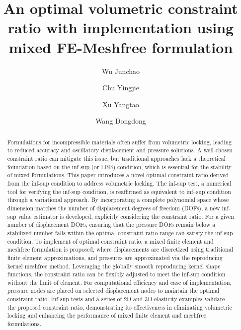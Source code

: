 \begin{frontmatter}

\title{An optimal volumetric constraint ratio with implementation using mixed FE-Meshfree formulation}

\author[1]{Wu Junchao}
\author[2]{Chu Yingjie}
\author[1]{Xu Yangtao}
\author[2]{Wang Dongdong}



\begin{abstract}
Formulations for incompressible materials often suffer from volumetric locking, leading to reduced accuracy and oscillatory displacement and pressure solutions.
A well-chosen constraint ratio can mitigate this issue, but traditional approaches lack a theoretical foundation based on the inf-sup (or LBB) condition, which is essential for the stability of mixed formulations.
This paper introduces a novel optimal constraint ratio derived from the inf-sup condition to address volumetric locking.
The inf-sup test, a numerical tool for verifying the inf-sup condition, is reaffirmed as equivalent to inf--sup condition through a variational approach.
By incorporating a complete polynomial space whose dimension matches the number of displacement degrees of freedom (DOFs),
a new inf-sup value estimator is developed, explicitly considering the constraint ratio.
For a given number of displacement DOFs, ensuring that the pressure DOFs remain below a stabilized number falls within the optimal constraint ratio range can satisfy the inf-sup condition.
To implement of optimal constraint ratio, a mixed finite element and meshfree formulation is proposed,
where displacements are discretized using traditional finite element approximations, and pressures are approximated via the reproducing kernel meshfree method.
Leveraging the globally smooth reproducing kernel shape functions,
the constraint ratio can be flexibly adjusted to meet the inf-sup condition without the limit of element.
For computational efficiency and ease of implementation, pressure nodes are placed on selected displacement nodes to maintain the optimal constraint ratio.
Inf-sup tests and a series of 2D and 3D elasticity examples validate the proposed constraint ratio, demonstrating its effectiveness in eliminating volumetric locking and enhancing the performance of mixed finite element and meshfree formulations.


\end{abstract}
\end{frontmatter}
